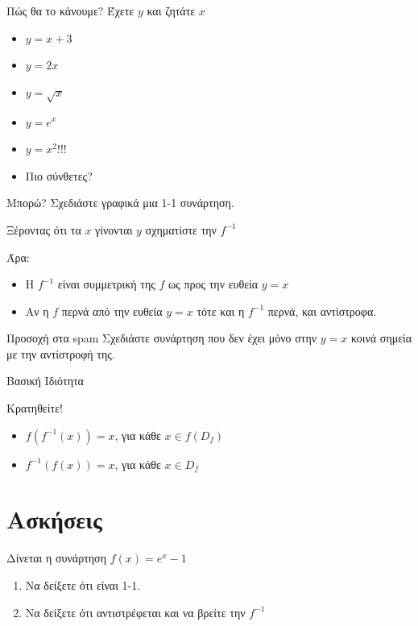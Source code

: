 \documentclass{presentation}
\begin{document}
\begin{frame}{Πώς θα το κάνουμε?}
  Έχετε $y$ και ζητάτε $x$ \pause
  \begin{itemize}
    \item $y=x+3$ \pause
    \item $y=2x$ \pause
    \item $y=\sqrt{x}$ \pause
    \item $y=e^x$ \pause
    \item $y=x^2$!!! \pause
    \item Πιο σύνθετες?
  \end{itemize}
\end{frame}

\begin{frame}{Μπορώ?}
  Σχεδιάστε γραφικά μια 1-1 συνάρτηση. \pause

  Ξέροντας ότι τα $x$ γίνονται $y$ σχηματίστε την $f^{-1}$ \pause

  Άρα:
  \begin{itemize}
    \item Η $f^{-1}$ είναι συμμετρική της $f$ ως προς την ευθεία $y=x$ \pause
    \item Αν η $f$ περνά από την ευθεία $y=x$ τότε και η $f^{-1}$ περνά, και αντίστροφα.
  \end{itemize} \pause
  \begin{alertblock}{Προσοχή στα spam}
    Σχεδιάστε συνάρτηση που δεν έχει μόνο στην $y=x$ κοινά σημεία με την αντίστροφή της.
  \end{alertblock}
\end{frame}

\begin{frame}{Βασική Ιδιότητα}
  \begin{exampleblock}{Κρατηθείτε!}
    \begin{itemize}
      \item $f\left(f^{-1}(x)\right)=x$, για κάθε $x\in f(D_f)$ \pause
      \item $f^{-1}\left(f(x)\right)=x$, για κάθε $x\in D_f$
    \end{itemize}
  \end{exampleblock}
\end{frame}

\section{Ασκήσεις}
\begin{askisi}
  Δίνεται η συνάρτηση $f(x)=e^x-1$
  \begin{enumerate}
    \item Να δείξετε ότι είναι 1-1. \pause
    \item Να δείξετε ότι αντιστρέφεται και να βρείτε την $f^{-1}$
  \end{enumerate}
\end{askisi}
\end{document}
